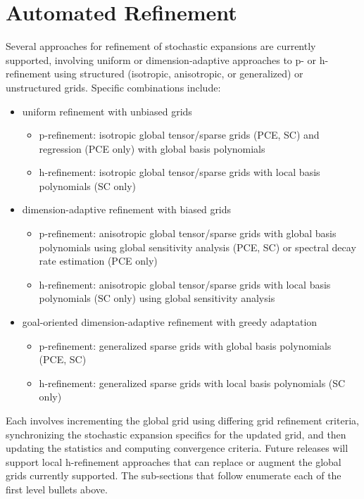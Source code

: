 \section{Automated Refinement}\label{uq:expansion:refine}

Several approaches for refinement of stochastic expansions are
currently supported, involving uniform or dimension-adaptive approaches
to p- or h-refinement using structured (isotropic, anisotropic, or
generalized) or unstructured grids.  Specific combinations include:
\begin{itemize}
\item uniform refinement with unbiased grids
  \begin{itemize}
  \item p-refinement: isotropic global tensor/sparse grids (PCE, SC)
    and regression (PCE only) with global basis polynomials
  \item h-refinement: isotropic global tensor/sparse grids with local
    basis polynomials (SC only)
  \end{itemize}
\item dimension-adaptive refinement with biased grids
  \begin{itemize}
  \item p-refinement: anisotropic global tensor/sparse grids with
    global basis polynomials using global sensitivity analysis (PCE,
    SC) or spectral decay rate estimation (PCE only)
  \item h-refinement: anisotropic global tensor/sparse grids with
    local basis polynomials (SC only) using global sensitivity analysis
  \end{itemize}
\item goal-oriented dimension-adaptive refinement with greedy adaptation
  \begin{itemize}
  \item p-refinement: generalized sparse grids with global basis
    polynomials (PCE, SC)
  \item h-refinement: generalized sparse grids with local basis
    polynomials (SC only)
  \end{itemize}
\end{itemize}
Each involves incrementing the global grid using differing grid
refinement criteria, synchronizing the stochastic expansion specifics
for the updated grid, and then updating the statistics and computing
convergence criteria.  Future releases will support local h-refinement
approaches that can replace or augment the global grids currently
supported.  The sub-sections that follow enumerate each of the first
level bullets above.


